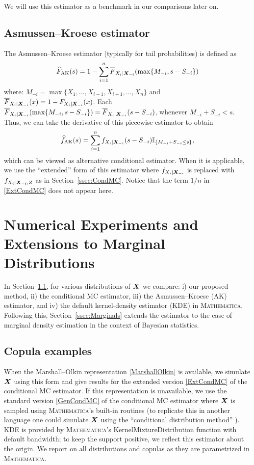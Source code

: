 We will use this estimator as a benchmark in our comparisons later on.

\subsection{Asmussen--Kroese estimator} \label{ssec:AK}

The Asmussen--Kroese estimator \cite{Asmussen2006} (typically for tail probabilities) is defined as 
\[
\widehat{F}_{\mathrm{AK}}(s) = 1 - \sum_{i=1}^n 
\overline{F}_{X_i | \boldsymbol{X}_{-i}}( \max\{ M_{-i}, s - S_{-i} \} ) \]
where: $M_{-i} = \max\{ X_1,\ldots,X_{i-1},X_{i+1},\ldots,X_n\}$  and  $\overline{F}_{X_i | \boldsymbol{X}_{-i}}(x)=1-F_{X_i | \boldsymbol{X}_{-i}}(x)$.
Each $\overline{F}_{X_i | \boldsymbol{X}_{-i}}( \max\{ M_{-i}, s - S_{-i} \} )=
\overline{F}_{X_i | \boldsymbol{X}_{-i}}( s - S_{-i})$,
whenever $M_{-i}+S_{-i}<s$. Thus,
we can take the derivative of this  piecewise  estimator to obtain
\[
\widehat{f}_{\mathrm{AK}}(s) = \sum_{i=1}^n 
f_{X_i | \boldsymbol{X}_{-i}}( s - S_{-i} ) \mathbb{I}_{\{M_{-i} + S_{-i} \le s  \}}, \]
which can be viewed as alternative conditional estimator.
When it is applicable, we use the ``extended'' form of this estimator where $f_{X_i | \boldsymbol{X}_{-i}}$ is replaced with $f_{X_i | \boldsymbol{X}_{-i}, Z}$ as in Section~\ref{ssec:CondMC}. Notice that the term  $1/n$ in \eqref{ExtCondMC} does not appear here. 

\section{Numerical Experiments and Extensions to Marginal Distributions} \label{sec:NumericalResults}

In Section~\ref{ssec:CopulaExamples}, for various distributions of $\boldsymbol{X}$ we compare: i) our proposed method, ii) the conditional MC estimator, iii) the Asmussen--Kroese (AK) estimator, and iv) the default kernel-density estimator (KDE) in \textsc{Mathematica}. Following this, Section~\ref{ssec:Marginals} extends the estimator to the case of marginal density estimation in the context of Bayesian statistics. 

\subsection{Copula examples} \label{ssec:CopulaExamples}

When the Marshall--Olkin representation \eqref{MarshallOlkin} is available, we simulate $\boldsymbol{X}$ using this form and give results for the extended version \eqref{ExtCondMC} of the conditional MC estimator. If this representation is unavailable, we use the standard version \eqref{GenCondMC} of the conditional MC estimator where $\boldsymbol{X}$ is sampled using \textsc{Mathematica}'s built-in routines (to replicate this in another language one could simulate $\boldsymbol{X}$ using the  ``conditional distribution method'' \cite[p.~41]{nelsen2006introduction}). KDE is provided by \textsc{Mathematica}'s {\sf KernelMixtureDistribution} function with default bandwidth; to keep the support positive, we reflect this estimator about the origin. We report on all distributions and copulas as they are parametrized in \textsc{Mathematica}. 
 
